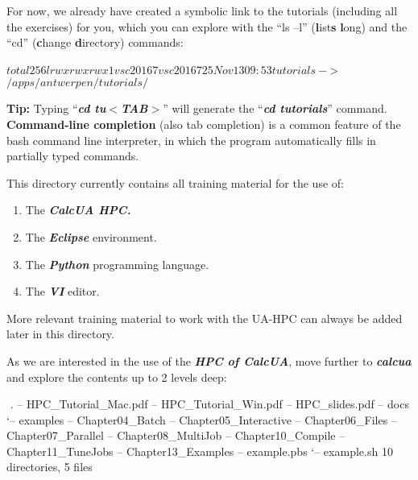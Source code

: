 For now, we already have created a symbolic link to the tutorials (including all the exercises) for you, which you can explore with the ``ls --l'' (\textbf{l}ist\textbf{s} \textbf{l}ong) and the ``cd'' (\textbf{c}hange \textbf{d}irectory) commands:

\begin{prompt}
$ %
total 256
lrwxrwxrwx 1 vsc20167 vsc20167 25 Nov 13 09:53 tutorials -$>$ /apps/antwerpen/tutorials/
$ %
\end{prompt}

\textbf{Tip: }Typing ``\textbf{\textit{cd tu$<$TAB$>$}}'' will generate the ``\textbf{\textit{cd tutorials}}'' command. \textbf{Command-line completion }(also tab completion) is a common feature of the bash command line interpreter, in which the program automatically fills in partially typed commands.


This directory currently contains all training material for the use of:

\begin{enumerate}
\item  The \textbf{\textit{CalcUA HPC.}}
\item  The \textbf{\textit{Eclipse}} environment.
\item  The \textbf{\textit{Python}} programming language.
\item  The \textbf{\textit{VI}} editor.
\end{enumerate}

More relevant training material to work with the UA-HPC can always be added later in this directory.

As we are interested in the use of the \textbf{\textit{HPC of CalcUA}}, move further to \textbf{\textit{calcua}} and explore the contents up to 2 levels deep:

\begin{prompt}
$ %
$ %
.
\textbar -- HPC\_Tutorial\_Mac.pdf
\textbar -- HPC\_Tutorial\_Win.pdf
\textbar -- HPC\_slides.pdf
\textbar -- docs
`-- examples
    \textbar -- Chapter04\_Batch
    \textbar -- Chapter05\_Interactive
    \textbar -- Chapter06\_Files
    \textbar -- Chapter07\_Parallel
    \textbar -- Chapter08\_MultiJob
    \textbar -- Chapter10\_Compile
    \textbar -- Chapter11\_TuneJobs
    \textbar -- Chapter13\_Examples
    \textbar -- example.pbs
    `-- example.sh
10 directories, 5 files
\end{prompt}

